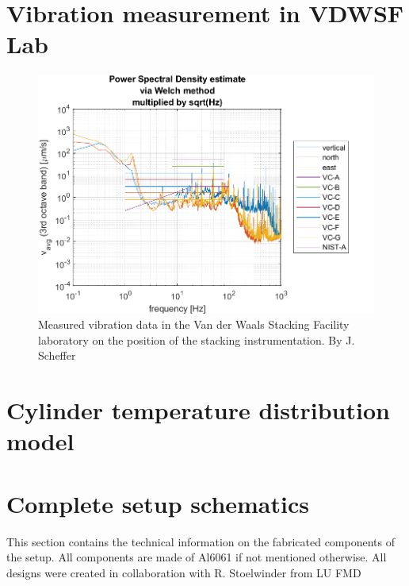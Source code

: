 \documentclass[10pt]{article}
\begin{document}
\clearpage
\section{Vibration measurement in VDWSF Lab}
\label{ap:vibrational_measurement}

\begin{figure}[htp]
  \centering
  \begin{minipage}[b]{1\textwidth}
    \includegraphics[width=\textwidth]{img/resonance/geophone_measurement_position_1.png}
    \caption{Measured vibration data in the Van der Waals Stacking Facility laboratory on the position of the stacking instrumentation. By J. Scheffer}
    \label{ap:GEOPhone_measurement}
  \end{minipage}
\end{figure}


\clearpage
\section{Cylinder temperature distribution model}
\label{ap:cylinder_mode}


\clearpage
\section{Complete setup schematics}

This section contains the technical information on the fabricated components of the setup.
All components are made of Al6061 if not mentioned otherwise.
All designs were created in collaboration with R. Stoelwinder from LU FMD
\end{document}

